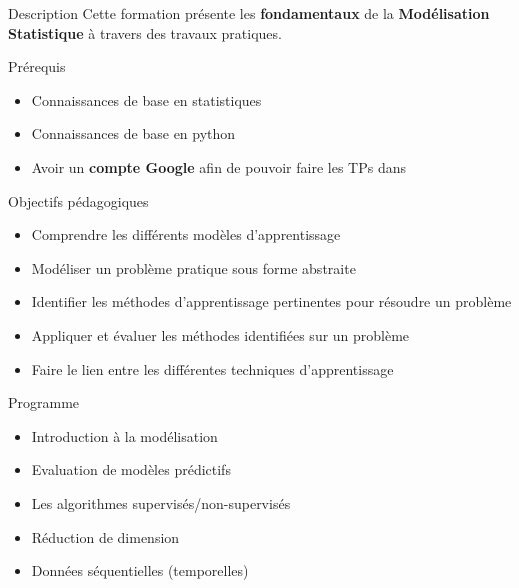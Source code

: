 
\begin{frame}{Description}
  Cette formation présente les \textbf{fondamentaux} de la \textbf{Modélisation Statistique} à travers des travaux pratiques.
\end{frame}

\begin{frame}{Prérequis}
  \begin{itemize}
  \item Connaissances de base en statistiques
  \item Connaissances de base en python
  \item Avoir un \textbf{compte Google} afin de pouvoir faire les TPs dans 
  \end{itemize}
\end{frame}

\begin{frame}{Objectifs pédagogiques}
  \begin{itemize}
  \item Comprendre les différents modèles d'apprentissage
  \item Modéliser un problème pratique sous forme abstraite
  \item Identifier les méthodes d'apprentissage pertinentes pour résoudre un problème
  \item Appliquer et évaluer les méthodes identifiées sur un problème
  \item Faire le lien entre les différentes techniques d'apprentissage
  \end{itemize}
\end{frame}

\begin{frame}{Programme}
  \begin{itemize}
  \item Introduction à la modélisation
  \item Evaluation de modèles prédictifs
  \item Les algorithmes supervisés/non-supervisés
  \item Réduction de dimension
  \item Données séquentielles (temporelles)
  \end{itemize}
\end{frame}

